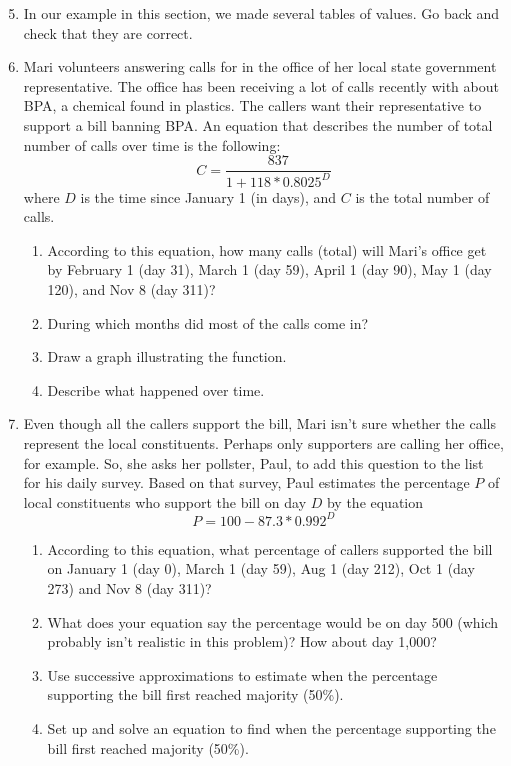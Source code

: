 \begin{enumerate} 
\setcounter{enumi}{4}
\item In our example in this section, we made several tables of values.  Go back and check that they are correct.

\item Mari volunteers answering calls for in the office of her local state government representative.  The office has been receiving a lot of calls recently with about BPA, a chemical found in plastics.  The callers want their representative to support a bill banning BPA.  An equation that describes the number of total number of calls over time is the following:
$$ C=\frac{837}{1+118\ast 0.8025^D}$$ %
where $D$ is the time since January 1 (in days), and $C$ is the total number of calls.

\begin{enumerate}
\item According to this equation, how many calls (total) will Mari's office get by February 1 (day 31), March 1 (day 59), April 1 (day 90), May 1 (day 120), and Nov 8 (day 311)?
\item During which months did most of the calls come in? 
\item Draw a graph illustrating the function.
\item Describe what happened over time.
\end{enumerate}

\item Even though all the callers support the bill, Mari isn't sure whether the calls represent the local constituents.  Perhaps only supporters are calling her office, for example.  So, she asks her pollster, Paul, to add this question to the list for his daily survey.  Based on that survey, Paul estimates the percentage $P$ of local constituents who support the bill on day $D$ by the equation $$P =100 - 87.3 \ast 0.992^D$$ %
\begin{enumerate}
\item According to this equation, what percentage of callers supported the bill on January 1 (day 0), March 1 (day 59), Aug 1 (day 212), Oct 1 (day 273) and Nov 8 (day 311)?
\item What does your equation say the percentage would be on day 500 (which probably isn't realistic in this problem)?  How about day 1,000?
\item Use successive approximations to estimate when the percentage supporting the bill first reached  majority (50\%).
\item Set up and solve an equation to find  when the percentage supporting the bill first reached  majority (50\%).
\end{enumerate}
 

\end{enumerate}
